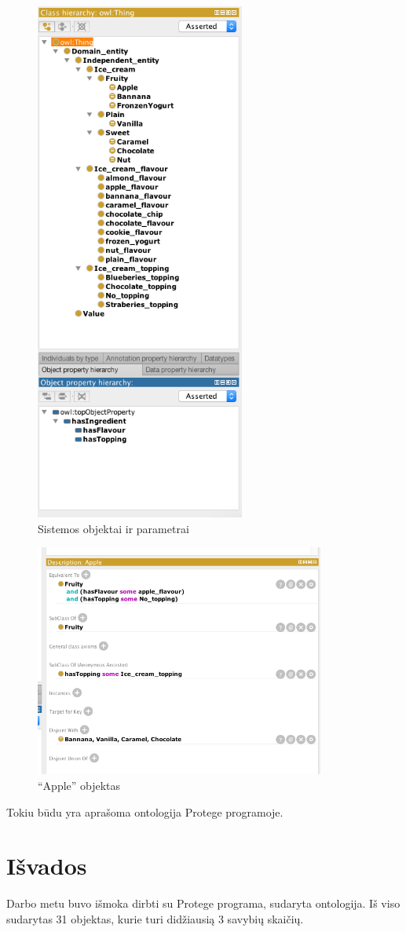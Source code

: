 \documentclass[11pt, a4paper, lithuanian]{article}
\begin{document}
    \begin{figure}
      \centering
      \includegraphics[width=260px]{img/class_and_properties.png}
      \caption{Sistemos objektai ir parametrai}
      \label{img:sistemos_objektai_ir_parametrai}
    \end{figure}

    \begin{figure}
      \centering
      \includegraphics[width=360px]{img/apple.png}
      \caption{``Apple'' objektas}
      \label{img:appl_objektas}
    \end{figure}

    Tokiu būdu yra aprašoma ontologija Protege programoje.

    \section{Išvados}

    Darbo metu buvo išmoka dirbti su Protege programa, sudaryta ontologija. Iš viso sudarytas 31 objektas, kurie turi didžiausią 3 savybių skaičių.
\end{document}
